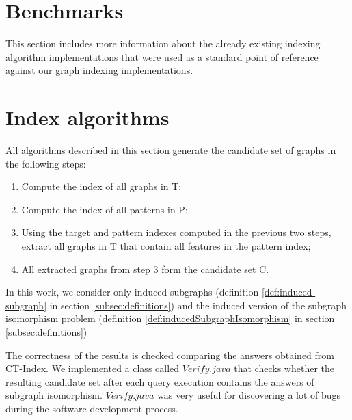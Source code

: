 \documentclass{l4proj}
\begin{document}
\section{Benchmarks} %
This section includes more information about the already existing indexing algorithm implementations that were used as a standard point of reference against our graph indexing implementations. 





\section{Index algorithms}

    All algorithms described in this section generate the candidate set of graphs in the following steps:
    
    \begin{enumerate}
        \label{indexSteps}
        \item Compute the index of all graphs in T;
        \item Compute the index of all patterns in P;
        \item Using the target and pattern indexes computed in the previous two steps, extract all graphs in T that contain all features in the pattern index;
        \item All extracted graphs from step 3 form the candidate set C.
	\end{enumerate}
    
    In this work, we consider only induced subgraphs (definition \ref{def:induced-subgraph} in section \ref{subsec:definitions}) and the induced version of the subgraph isomorphism problem (definition \ref{def:inducedSubgraphIsomorphism} in section \ref{subsec:definitions})
    
    The correctness of the results is checked comparing the answers obtained from CT-Index. We implemented a class called $Verify.java$ that checks whether the resulting candidate set after each query execution contains the answers of subgraph isomorphism. $Verify.java$ was very useful for discovering a lot of bugs during the software development process.
    
\end{document}
